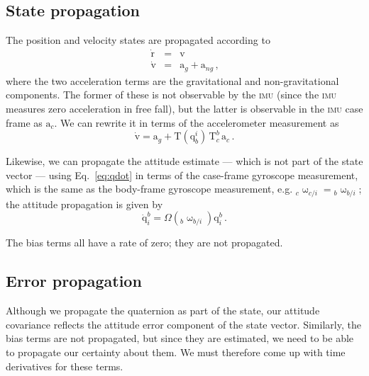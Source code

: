 \documentclass[12pt]{article}
\newcommand{\Tf}[2]{\ensuremath{\mathrm{T}_{#1}^{#2}}}
\newcommand{\Qf}[2]{\ensuremath{\mathrm{q}_{#1}^{#2}}}
\newcommand{\vecr}{\ensuremath{\mathrm{r}}}
\newcommand{\vecv}{\ensuremath{\mathrm{v}}}
\begin{document}
\subsection{State propagation}
The position and velocity states are propagated according to
\begin{eqnarray}
\dot{\vecr} &=& \vecv \\
\dot{\vecv} &=& \mathrm{a}_g + \mathrm{a}_{ng}\nonumber\,\text{,}
\end{eqnarray}
where the two acceleration terms are the gravitational and non-gravitational components. The former of these is not observable by the \textsc{imu} (since the \textsc{imu} measures zero acceleration in free fall), but the latter is observable in the \textsc{imu} case frame as $\mathrm{a}_c$. We can rewrite it in terms of the accelerometer measurement as
\begin{equation}
\dot{\vecv} = \mathrm{a}_g + \mathrm{T}(\Qf{b}{i})\, \Tf{c}{b} \, \mathrm{a}_c\,\text{.}
\end{equation}

Likewise, we can propagate the attitude estimate --- which is not part of the state vector --- using Eq.~\ref{eq:qdot} in terms of the case-frame gyroscope measurement, which is the same as the body-frame gyroscope measurement, e.g. ${}_c\upomega_{c/i} = {}_b\upomega_{b/i}$; the attitude propagation is given by
\begin{equation}
\dot{\mathrm{q}}_i^b = \Omega({}_b\upomega_{b/i}) \Qf{i}{b}\,\text{.}
\end{equation}

The bias terms all have a rate of zero; they are not propagated.

\subsection{Error propagation}
Although we propagate the quaternion as part of the state, our attitude covariance reflects the attitude error component of the state vector. Similarly, the bias terms are not propagated, but since they are estimated, we need to be able to propagate our certainty about them. We must therefore come up with time derivatives for these terms.
\end{document}
